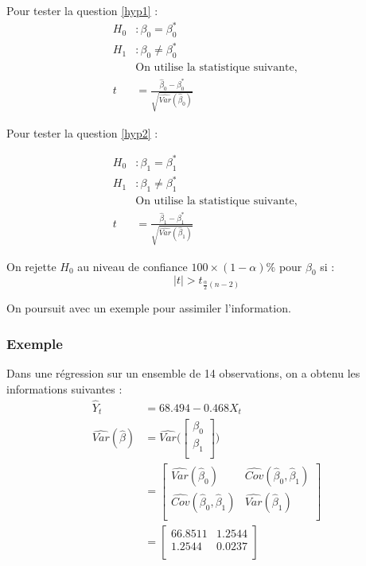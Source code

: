 \documentclass[11pt,french]{report}
\begin{document}
Pour tester la question \ref{hyp1} :
\begin{align*}
H_0 &: \beta_0 = \beta_0^* \\
H_1 &: \beta_0 \neq \beta_0^* \\
&\text{On utilise la statistique suivante, } \\
t &= \frac{\hat{\beta}_0 - \beta_0^* }{\sqrt{\widehat{Var}(\hat{\beta}_0)}}
\end{align*}

Pour tester la question  \ref{hyp2} :

\begin{align*}
H_0 &: \beta_1 = \beta_1^* \\
H_1 &: \beta_1 \neq \beta_1^* \\
&\text{On utilise la statistique suivante, } \\
t &= \frac{\hat{\beta}_1 - \beta_1^* }{\sqrt{\widehat{Var}(\hat{\beta}_1)}}
\end{align*}

On rejette $H_0$ au niveau de confiance $100 \times (1 - \alpha)\%$ pour $\beta_0$ si :
$$
|t| > t_{\frac{\alpha}{2}(n-2)}
$$

\bigskip
On poursuit avec un exemple pour assimiler l'information.

\subsubsection*{Exemple}
Dans une régression sur un ensemble de 14 observations, on a obtenu les informations suivantes :
\begin{align*}
\hat{Y}_t &= 68.494 - 0.468X_t \\
\widehat{Var}(\hat{\beta}) &= \widehat{Var}\Bigg(
\begin{bmatrix}
  \beta_0 \\
  \beta_1 \\ 
\end{bmatrix}\Bigg) \\
&= 
\begin{bmatrix}
  \widehat{Var}(\hat{\beta}_0) & \widehat{Cov}(\hat{\beta}_0, \hat{\beta}_1)\\
  \widehat{Cov}(\hat{\beta}_0, \hat{\beta}_1)  & \widehat{Var}(\hat{\beta}_1)\\ 
\end{bmatrix} \\
&= 
\begin{bmatrix}
  66.8511 & 1.2544\\
  1.2544 & 0.0237\\ 
\end{bmatrix} \\
\end{align*}
\end{document}
